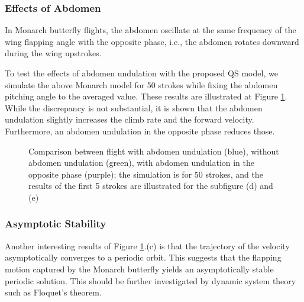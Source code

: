 \documentclass[10pt]{article}
\begin{document}
\subsubsection{Effects of Abdomen}

In Monarch butterfly flights, the abdomen oscillate at the same frequency of the wing flapping angle with the opposite phase,
i.e., the abdomen rotates downward during the wing upstrokes. 


To test the effects of abdomen undulation with the proposed QS model, we simulate the above Monarch model for 50 strokes while fixing the abdomen pitching angle to the averaged value. 
These results are illustrated at Figure \ref{fig:comp_ab}.
While the discrepancy is not substantial, it is shown that the abdomen undulation slightly increases the climb rate and the forward velocity.  
Furthermore, an abdomen undulation in the opposite phase reduces those. 

\begin{figure}[p]
    \centerline{
        \hfill
    }
    \centerline{
        \hfill
    }
    \centerline{
    }
    \caption{Comparison between flight with abdomen undulation (blue), without abdomen undulation (green), with abdomen undulation in the opposite phase (purple); the simulation is for 50 strokes, and the results of the first 5 strokes are illustrated for the subfigure (d) and (e)}\label{fig:comp_ab}
\end{figure}

\subsubsection{Asymptotic Stability}

Another interesting results of Figure \ref{fig:comp_ab}.(c) is that the trajectory of the velocity asymptotically converges to a periodic orbit.  
This suggests that the flapping motion captured by the Monarch butterfly yields an asymptotically stable periodic solution. 
This should be further investigated by dynamic system theory such as Floquet's theorem. 
\end{document}
